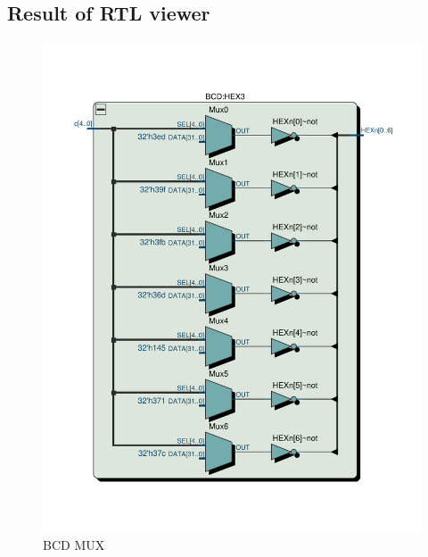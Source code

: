 \documentclass[13pt,a4paper]{report}
\begin{document}
\subsection{Result of RTL viewer}
\begin{figure}[H]
\centering
\includegraphics[scale=0.5, clip, trim={0cm 3cm 0cm 3.3cm}]{images/Exc2_BCD_RTL.pdf}
\caption*{BCD MUX}
\end{figure}
\end{document}
